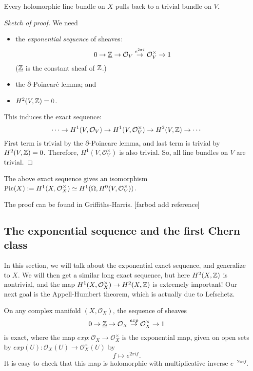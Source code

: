 \begin{proposition}
Every holomorphic line bundle on $X$ pulls back to a trivial bundle on $V$. 
\end{proposition}

\begin{proof}[Sketch of proof]
We need
\begin{itemize}
\item the \emph{exponential sequence} of sheaves:
$$0\to \underline{{\mathbb Z}}\to \mathcal{O}_V\overset{e^{2\pi i}}{\to}\mathcal{O}_V^\times \to 1$$
($\underline{{\mathbb Z}}$ is the constant sheaf of ${\mathbb Z}$.)

\item the $\overline{\partial}$-Poincar\'{e} lemma; and
\item $H^2(V,{\mathbb Z})=0$.
\end{itemize}

This induces the exact sequence:
$$\cdots \to H^1(V,\mathcal{O}_V)\to H^1(V,\mathcal{O}_V^\times)\to H^2(V,{\mathbb Z})\to \cdots$$
First term is trivial by the $\overline{\partial}$-Poincare lemma, and last term is trivial by $H^2(V,{\mathbb Z})=0$. Therefore, $H^1(V,\mathcal{O}_V^\times)$ is also trivial. So, all line bundles on $V$ are trivial. 
\end{proof}



\begin{corollary}
The above exact sequence gives an isomorphism
$\operatorname{Pic}(X):=H^1(X,\mathcal{O}_X^\times)\simeq H^1(\Omega,H^0(V,\mathcal{O}_V^\times))$.
\end{corollary}

The proof can be found in Griffiths-Harris. [farbod add reference]



\subsection{The exponential sequence and the first Chern class}

In this section, we will talk about the exponential exact sequence, and generalize to $X$. We will then get a similar long exact sequence, but here $H^2(X,{\mathbb Z})$ is nontrivial, and the map $H^1(X,\mathcal{O}_X^\times)\to H^2(X,{\mathbb Z})$ is extremely important! Our next goal is the Appell-Humbert theorem, which is actually due to Lefschetz.

On any complex manifold $(X,\mathcal{O}_X)$, the sequence of sheaves 
$$0\to \underline{{\mathbb Z}}\to \mathcal{O}_X\overset{exp}{\to} \mathcal{O}_X^\times \to 1$$
is exact, where the map $exp:\mathcal{O}_X\to \mathcal{O}_X^\times$ is the exponential map, given on open sets by  
$exp(U):\mathcal{O}_X(U)\to \mathcal{O}_X^\times(U)$ by 
$$f\mapsto e^{2\pi i f}.$$
It is easy to check that this map is holomorphic  with multiplicative inverse $e^{-2\pi i f}$. 


